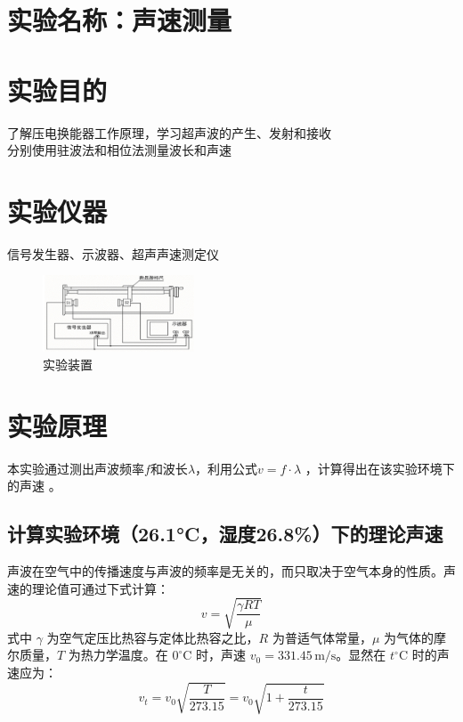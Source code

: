 \documentclass[12pt,a4paper]{article}
\begin{document}

	
	\section{实验名称：声速测量}
	
	\section{实验目的}
		了解压电换能器工作原理，学习超声波的产生、发射和接收\\
		分别使用驻波法和相位法测量波长和声速

	\section{实验仪器}
		信号发生器、示波器、超声声速测定仪
		\begin{figure}[H]
			\centering
			\includegraphics[width=0.4\textwidth]{驻波法.png} %
			\caption{实验装置}
			\label{fig:example}
		\end{figure}

	\section{实验原理}
		本实验通过测出声波频率$f$和波长$\lambda$，利用公式$v = f \cdot \lambda$ ，计算得出在该实验环境下的声速 。
		
		\subsection{计算实验环境（26.1°C，湿度26.8\%）下的理论声速}
		声波在空气中的传播速度与声波的频率是无关的，而只取决于空气本身的性质。声速的理论值可通过下式计算：
			\begin{equation}
				v = \sqrt{\frac{\gamma RT}{\mu}}
			\end{equation}
			式中 $\gamma$ 为空气定压比热容与定体比热容之比，$R$ 为普适气体常量，$\mu$ 为气体的摩尔质量，$T$ 为热力学温度。在 $0^\circ \text{C}$ 时，声速 $v_0 = 331.45 \, \mathrm{m/s}$。显然在 $t^\circ \text{C}$ 时的声速应为：
			\begin{equation}
				v_t = v_0 \sqrt{\frac{T}{273.15}} = v_0 \sqrt{1+\frac{t}{273.15}}
			\end{equation}
\end{document}
